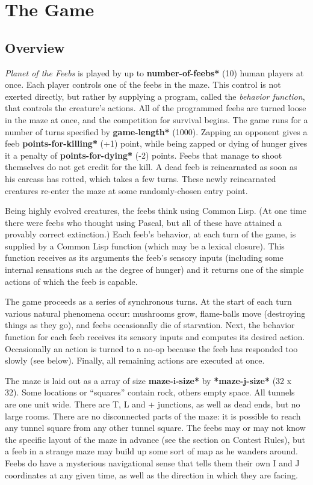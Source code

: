 \documentclass[12pt]{article}
\begin{document}
\section{The Game}

\subsection {Overview}

{\em Planet of the Feebs} is played by up to {\bf *number-of-feebs*}
(10) human players at once.  Each player controls one of the feebs in
the maze.  This control is not exerted directly, but rather by
supplying a program, called the {\em behavior function}, that controls
the creature's actions.  All of the programmed feebs are turned loose
in the maze at once, and the competition for survival begins.  The
game runs for a number of turns specified by {\bf *game-length*}
(1000).  Zapping an opponent gives a feeb {\bf *points-for-killing*}
(+1) point, while being zapped or dying of hunger gives it a penalty
of {\bf *points-for-dying*} (-2) points.  Feebs that manage to shoot
themselves do not get credit for the kill.  A dead feeb is
reincarnated as soon as his carcass has rotted, which takes a few
turns.  These newly reincarnated creatures re-enter the maze at some
randomly-chosen entry point.

Being highly evolved creatures, the feebs think using Common Lisp.  (At
one time there were feebs who thought using Pascal, but all of these
have attained a provably correct extinction.)  Each feeb's behavior, at
each turn of the game, is supplied by a Common Lisp function (which may
be a lexical closure).  This function receives as its arguments the
feeb's sensory inputs (including some internal sensations such as the
degree of hunger) and it returns one of the simple actions of which the
feeb is capable.

The game proceeds as a series of synchronous turns.  At the start of
each turn various natural phenomena occur: mushrooms grow, flame-balls
move (destroying things as they go), and feebs occasionally die of
starvation.  Next, the behavior function for each feeb receives its
sensory inputs and computes its desired action.  Occasionally an action
is turned to a no-op because the feeb has responded too slowly (see
below).  Finally, all remaining actions are executed at once.

The maze is laid out as a array of size {\bf *maze-i-size*} by {\bf
*maze-j-size*} (32 x 32).  Some locations or ``squares'' contain rock,
others empty space.  All tunnels are one unit wide.  There are T, L
and + junctions, as well as dead ends, but no large rooms.  There are
no disconnected parts of the maze: it is possible to reach any tunnel
square from any other tunnel square.  The feebs may or may not know
the specific layout of the maze in advance (see the section on Contest
Rules), but a feeb in a strange maze may build up some sort of map as
he wanders around.  Feebs do have a mysterious navigational sense that
tells them their own I and J coordinates at any given time, as well as
the direction in which they are facing.
\end{document}
